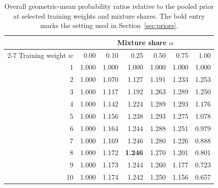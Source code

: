 \documentclass[10pt]{article}
\begin{document}
\begin{table}[H]\centering\small
\begin{tabular}{rrrrrrr}
\toprule
& \multicolumn{6}{c}{Mixture share $\alpha$} \\
\cmidrule(lr){2-7}
Training weight $w$ & 0.00 & 0.10 & 0.25 & 0.50 & 0.75 & 1.00 \\
\midrule
1 & 1.000 & 1.000 & 1.000 & 1.000 & 1.000 & 1.000 \\
2 & 1.000 & 1.070 & 1.127 & 1.191 & 1.233 & 1.253 \\
3 & 1.000 & 1.117 & 1.192 & 1.263 & 1.289 & 1.250 \\
4 & 1.000 & 1.142 & 1.224 & 1.289 & 1.293 & 1.176 \\
5 & 1.000 & 1.156 & 1.238 & 1.293 & 1.275 & 1.078 \\
6 & 1.000 & 1.164 & 1.244 & 1.288 & 1.251 & 0.979 \\
7 & 1.000 & 1.169 & 1.246 & 1.280 & 1.226 & 0.888 \\
8 & 1.000 & 1.172 & \textbf{1.246} & 1.270 & 1.201 & 0.801 \\
9 & 1.000 & 1.173 & 1.244 & 1.260 & 1.177 & 0.723 \\
10 & 1.000 & 1.174 & 1.242 & 1.250 & 1.156 & 0.657 \\
\bottomrule
\end{tabular}
\caption{Overall geometric-mean probability ratios relative to the pooled prior at selected training weights and mixture shares. The bold entry marks the setting used in Section~\ref{sec:priors}.}
\label{tab:prior-ablation}
\end{table}
\end{document}
